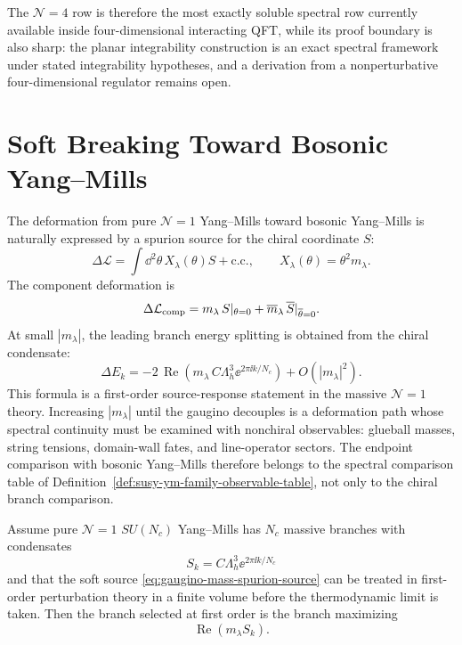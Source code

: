 The \(\mathcal N=4\) row is therefore the most exactly soluble spectral row
currently available inside four-dimensional interacting QFT, while its
proof boundary is also sharp: the planar integrability construction is an
exact spectral framework under stated integrability hypotheses, and a
derivation from a nonperturbative four-dimensional regulator remains open.

\section{Soft Breaking Toward Bosonic Yang--Mills}
\label{sec:susy-ym-family-soft-breaking-to-bosonic}

The deformation from pure \(\mathcal N=1\) Yang--Mills toward bosonic
Yang--Mills is naturally expressed by a spurion source for the chiral
coordinate \(S\):
\begin{equation}
  \Delta\mathcal L
  =
  \int\dd^2\theta\,X_\lambda(\theta)S+\mathrm{c.c.},
  \qquad
  X_\lambda(\theta)=\theta^2m_\lambda .
  \label{eq:gaugino-mass-spurion-source}
\end{equation}
The component deformation is
\begin{equation}
  \Delta\mathcal L_{\rm comp}
  =
  m_\lambda\,S|_{\theta=0}
  +
  \overline m_\lambda\,\overline S|_{\overline\theta=0}.
  \label{eq:gaugino-mass-component-source}
\end{equation}
At small \(|m_\lambda|\), the leading branch energy splitting is obtained
from the chiral condensate:
\begin{equation}
  \Delta E_k
  =
  -2\,\operatorname{Re}\!\left(
    m_\lambda\,C\Lambda_h^3\ee^{2\pi\ii k/N_c}
  \right)
  +O(|m_\lambda|^2).
  \label{eq:gaugino-mass-branch-splitting}
\end{equation}
This formula is a first-order source-response statement in the massive
\(\mathcal N=1\) theory.  Increasing \(|m_\lambda|\) until the gaugino
decouples is a deformation path whose spectral continuity must be examined
with nonchiral observables: glueball masses, string tensions, domain-wall
fates, and line-operator sectors.  The endpoint comparison with bosonic
Yang--Mills therefore belongs to the spectral comparison table of
Definition~\ref{def:susy-ym-family-observable-table}, not only to the
chiral branch comparison.

\begin{controlledapproximation}
\label{ca:small-soft-mass-branch-selection}
Assume pure \(\mathcal N=1\) \(SU(N_c)\) Yang--Mills has \(N_c\) massive
branches with condensates
\[
  S_k=C\Lambda_h^3\ee^{2\pi\ii k/N_c}
\]
and that the soft source \eqref{eq:gaugino-mass-spurion-source} can be
treated in first-order perturbation theory in a finite volume before the
thermodynamic limit is taken.  Then the branch selected at first order is the
branch maximizing
\[
  \operatorname{Re}(m_\lambda S_k).
\]
\end{controlledapproximation}

